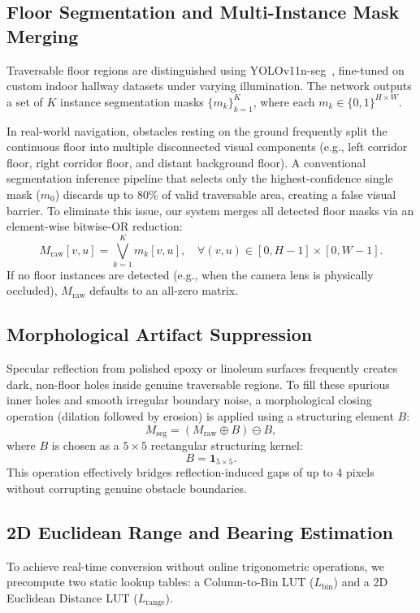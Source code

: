 \documentclass[preprint,12pt]{elsarticle}
\begin{document}
\subsection{Floor Segmentation and Multi-Instance Mask Merging}
\label{subsec:floor_seg}
Traversable floor regions are distinguished using YOLOv11n-seg~\cite{ultralytics_2024_ultralytics}, fine-tuned on custom indoor hallway datasets under varying illumination. The network outputs a set of $K$ instance segmentation masks $\{m_k\}_{k=1}^K$, where each $m_k \in \{0, 1\}^{H \times W}$.

In real-world navigation, obstacles resting on the ground frequently split the continuous floor into multiple disconnected visual components (e.g., left corridor floor, right corridor floor, and distant background floor). A conventional segmentation inference pipeline that selects only the highest-confidence single mask ($m_0$) discards up to 80\% of valid traversable area, creating a false visual barrier. To eliminate this issue, our system merges all detected floor masks via an element-wise bitwise-OR reduction:
\begin{equation}
  M_{\mathrm{raw}}[v, u] = \bigvee_{k=1}^K m_k[v, u], \quad \forall (v, u) \in [0, H-1] \times [0, W-1].
\end{equation}
If no floor instances are detected (e.g., when the camera lens is physically occluded), $M_{\mathrm{raw}}$ defaults to an all-zero matrix.

\subsection{Morphological Artifact Suppression}
Specular reflection from polished epoxy or linoleum surfaces frequently creates dark, non-floor holes inside genuine traversable regions. To fill these spurious inner holes and smooth irregular boundary noise, a morphological closing operation (dilation followed by erosion) is applied using a structuring element $B$:
\begin{equation}
  M_{\mathrm{seg}} = (M_{\mathrm{raw}} \oplus B) \ominus B,
\end{equation}
where $B$ is chosen as a $5 \times 5$ rectangular structuring kernel:
\begin{equation}
  B = \mathbf{1}_{5 \times 5}.
\end{equation}
This operation effectively bridges reflection-induced gaps of up to 4 pixels without corrupting genuine obstacle boundaries.

\subsection{2D Euclidean Range and Bearing Estimation}
\label{subsec:lut}
To achieve real-time conversion without online trigonometric operations, we precompute two static lookup tables: a Column-to-Bin LUT ($L_{\mathrm{bin}}$) and a 2D Euclidean Distance LUT ($L_{\mathrm{range}}$).
\end{document}
